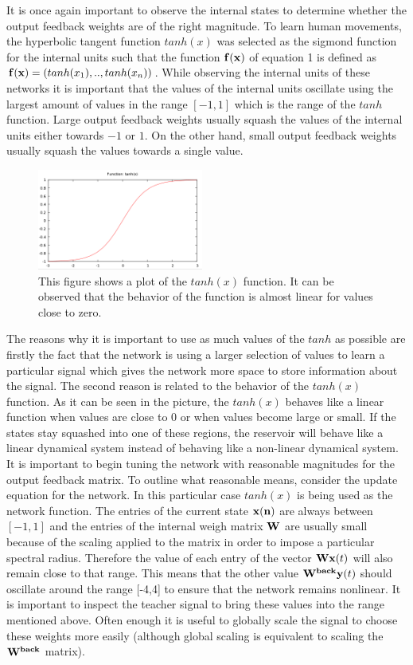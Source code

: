 \documentclass[letterpaper,9pt]{article}
\begin{document}
It is once again important to observe the internal states to determine whether the output feedback weights are of the right magnitude. To learn human movements, the hyperbolic tangent function $tanh(x)$ was selected as the sigmond function for the internal units such that the function ${\bf f(x)}$ of equation 1 is defined as ${\bf f(x)} = (tanh(x_1),..,tanh(x_n))$. While observing the internal units of these networks it is important that the values of the internal units oscillate using the largest amount of values in the range $[-1,1]$ which is the range of the $tanh$ function. Large output feedback weights usually squash the values of the internal units either towards $-1$ or $1$. On the other hand, small output feedback weights usually squash the values towards a single value.

\begin{figure}[h!]
  \centering
  \includegraphics[height=125px]{Extra/tanh.png}
    \caption[Plot of $tanh(x)$ Function]{This figure shows a plot of the $tanh(x)$ function. It can be observed that the behavior of the function is almost linear for values close to zero.}
\end{figure}


The reasons why it is important to use as much values of the $tanh$ as possible are firstly the fact that the network is using a larger selection of values to learn a particular signal which gives the network more space to store information about the signal. The second reason is related to the behavior of the $tanh(x)$ function. As it can be seen in the picture, the $tanh(x)$ behaves like a linear function when values are close to 0 or when values become large or small. If the states stay squashed into one of these regions, the reservoir will behave like a linear dynamical system instead of behaving like a non-linear dynamical system.\\

It is important to begin tuning the network with reasonable magnitudes for the output feedback matrix. To outline what reasonable means, consider the update equation for the network. In this particular case $tanh(x)$ is being used as the network function. The entries of the current state ${\bf x(n)}$ are always between $[-1,1]$ and the entries of the internal weigh matrix ${\bf W}$ are usually small because of the scaling applied to the matrix in order to impose a particular spectral radius. Therefore the value of each entry of the vector ${\bf Wx}(t)$ will also remain close to that range. This means that the other value ${\bf W^{back}y}(t)$ should oscillate around the range [-4,4] to ensure that the network remains nonlinear. It is important to inspect the teacher signal to bring these values into the range mentioned above. Often enough it is useful to globally scale the signal to choose these weights more easily (although global scaling is equivalent to scaling the ${\bf W^{back}}$ matrix).
\end{document}
